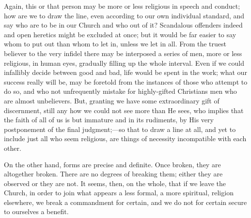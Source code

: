 Again, this or that person may be more or less religious in speech
and conduct; how are we to draw the line, even according to our own
individual standard, and say who are to be in our Church and who out
of it? Scandalous offenders indeed and open heretics might be excluded
at once; but it would be far easier to say whom to put out than whom
to let in, unless we let in all. From the truest believer to the very
infidel there may be interposed a series of men, more or less
religious, in human eyes, gradually filling up the whole interval.
Even if we could infallibly decide between good and bad, life would be
spent in the work; what our success really will be, may be foretold
from the instances of those who attempt to do so, and who not
unfrequently mistake for highly-gifted Christians men who are almost
unbelievers. But, granting we have some extraordinary gift of
discernment, still any how we could not see more than He sees, who
implies that the faith of all of us is but immature and in its
rudiments, by His very postponement of the final judgment;—so that
to draw a line at all, and yet to include just all who seem religious,
are things of necessity incompatible with each other.

On the other hand, forms are precise and definite. Once broken,
they are altogether broken. There are no degrees of breaking them;
either they are observed or they are not. It seems, then, on the
whole, that if we leave the Church, in order to join what appears a
less formal, a more spiritual, religion elsewhere, we break a
commandment for certain, and we do not for certain secure to ourselves
a benefit.

